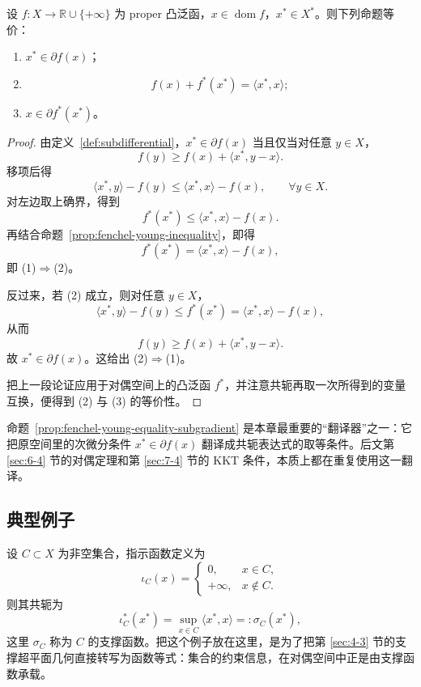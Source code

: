 \begin{proposition}\label{prop:fenchel-young-equality-subgradient}
设 $f\colon X\to \mathbb R\cup\{+\infty\}$ 为 proper 凸泛函，$x\in \operatorname{dom}f$，$x^\ast\in X^\ast$。则下列命题等价：
\begin{enumerate}
  \item $x^\ast\in \partial f(x)$；
  \item
  \[
  f(x)+f^\ast(x^\ast)=\langle x^\ast,x\rangle;
  \]
  \item $x\in \partial f^\ast(x^\ast)$。
\end{enumerate}
\end{proposition}

\begin{proof}
由定义~\ref{def:subdifferential}，$x^\ast\in \partial f(x)$ 当且仅当对任意 $y\in X$，
\[
f(y)\ge f(x)+\langle x^\ast,y-x\rangle.
\]
移项后得
\[
\langle x^\ast,y\rangle-f(y)\le \langle x^\ast,x\rangle-f(x),\qquad \forall y\in X.
\]
对左边取上确界，得到
\[
f^\ast(x^\ast)\le \langle x^\ast,x\rangle-f(x).
\]
再结合命题~\ref{prop:fenchel-young-inequality}，即得
\[
f^\ast(x^\ast)=\langle x^\ast,x\rangle-f(x),
\]
即 (1)$\Rightarrow$(2)。

反过来，若 (2) 成立，则对任意 $y\in X$，
\[
\langle x^\ast,y\rangle-f(y)\le f^\ast(x^\ast)=\langle x^\ast,x\rangle-f(x),
\]
从而
\[
f(y)\ge f(x)+\langle x^\ast,y-x\rangle.
\]
故 $x^\ast\in \partial f(x)$。这给出 (2)$\Rightarrow$(1)。

把上一段论证应用于对偶空间上的凸泛函 $f^\ast$，并注意共轭再取一次所得到的变量互换，便得到 (2) 与 (3) 的等价性。
\end{proof}

\begin{remark}
命题~\ref{prop:fenchel-young-equality-subgradient} 是本章最重要的“翻译器”之一：它把原空间里的次微分条件 $x^\ast\in\partial f(x)$ 翻译成共轭表达式的取等条件。后文第 \ref{sec:6-4} 节的对偶定理和第 \ref{sec:7-4} 节的 KKT 条件，本质上都在重复使用这一翻译。
\end{remark}

\subsection{典型例子}

\begin{example}[指示函数与支撑函数]\label{ex:indicator-support-conjugate}
设 $C\subset X$ 为非空集合，指示函数定义为
\[
\iota_C(x)=
\begin{cases}
0, & x\in C,\\
+\infty, & x\notin C.
\end{cases}
\]
则其共轭为
\[
\iota_C^\ast(x^\ast)=\sup_{x\in C}\langle x^\ast,x\rangle=: \sigma_C(x^\ast),
\]
这里 $\sigma_C$ 称为 $C$ 的支撑函数。把这个例子放在这里，是为了把第 \ref{sec:4-3} 节的支撑超平面几何直接转写为函数等式：集合的约束信息，在对偶空间中正是由支撑函数承载。
\end{example}

